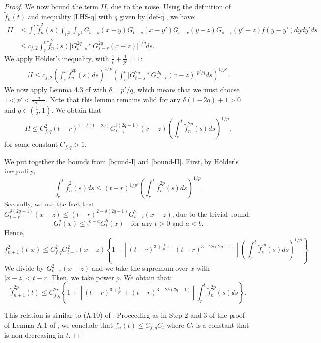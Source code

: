 \documentclass[12pt]{article}
\def\bR{\mathbb{R}}
\begin{document}
\begin{proof}
We now bound the term $II$, due to the noise. Using the definition of $\widetilde{f}_n(t)$ and inequality \eqref{LHS-q} with $q$ given by \eqref{def-q}, we have:
\begin{align*}
II & \leq \int_r^t \widetilde{f}_n^2(s) \int_{\bR^2} \int_{\bR^2} G_{t-s}(x-y) G_{t-s}(x-y') G_{s-r}(y-z) G_{s-r}(y'-z) f(y-y') dydy'ds \\
& \leq c_{f,2} \int_r^t \widetilde{f}_n^2(s) \big[ G_{t-s}^{2q}* G_{s-r}^{2q}(x-z)\big]^{1/q}ds.  
\end{align*}
We apply H\"older's inequality, with $\frac{1}{p}+\frac{1}{p'}=1$:
\begin{align*}
II \le c_{f,2} \left(\int_r^t \widetilde{f}_n^{2p}(s)ds \right)^{1/p} \left( \int_r^t \big[ G_{t-s}^{2q}* G_{s-r}^{2q}(x-z)\big]^{p'/q}ds \right)^{1/p'}.
\end{align*}
We now apply Lemma 4.3 of \cite{BNZ} with $\delta=p'/q$, which means that we must choose $1<p'<\frac{q}{2q-1}$. Note that this lemma remains valid for any $\delta(1-2q)+1>0$ and $q \in (\frac{1}{2},1)$. We obtain that
\begin{equation}
\label{bound-II}
II \leq C_{f,q}^2  (t-r)^{1-\delta(1-2q)} G_{t-r}^{\delta(2q-1)}(x-z) \left(\int_r^t \widetilde{f}_n^{2p}(s)ds \right)^{1/p},
\end{equation}
for some constant $C_{f,q}>1$.

We put together the bounds from \eqref{bound-I} and \eqref{bound-II}. First, by H\"older's inequality, 
\[
\int_r^t \widetilde{f}_n^2(s) ds \leq (t-r)^{1/p'} \left(\int_r^t \widetilde{f}_n^{2p}(s)ds \right)^{1/p}.
\]
Secondly, we use the fact that $G_{t-r}^{\delta(2q-1)}(x-z) \leq (t-r)^{2-\delta(2q-1)} G_{t-r}^{2}(x-z)$, due to the trivial bound:
\begin{equation}
\label{G-ab}
G_t^a(x) \leq t^{b-a} G_t^b(x) \quad \mbox{for any $t>0$ and $a<b$}.
\end{equation}
Hence,
\[
f_{n+1}^2(t,x) \le C_{f,q}^2 G_{t-r}^2(x-z) \left\{1+ [(t-r)^{3+\frac{1}{p'}}+(t-r)^{3-2\delta(2q-1)}] \left( \int_r^t \widetilde f_n^{2p}(s)ds\right)^{1/p}\right\}
\]
We divide by $G_{t-r}^2(x-z)$ and we take the supremum over $x$ with $|x-z|<t-r$. Then, we take power $p$. We obtain that:
\[
\widetilde{f}_{n+1}^{2p}(t) \le C_{f,q}^{2p} \left\{1+ [(t-r)^{3+\frac{1}{p'}}+(t-r)^{3-2\delta(2q-1)}]  \int_r^t \widetilde f_n^{2p}(s)ds\right\}.
\]

This relation is similar to (A.10) of \cite{BS26}. Proceeding as in Step 2 and 3 of the proof of Lemma A.1 of \cite{BS26}, we conclude that $\widetilde{f}_{n}(t) \leq C_{f,q} C_t$ where $C_t$ is a constant that is non-decreasing in $t$.
\end{proof}
\end{document}
